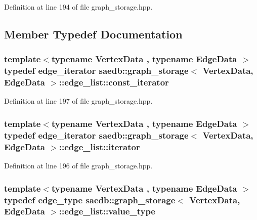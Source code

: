 Definition at line 194 of file graph\-\_\-storage.\-hpp.



\subsection{Member Typedef Documentation}
\hypertarget{classsaedb_1_1graph__storage_1_1edge__list_a830dd554e74e9322240247109b704635}{
\subsubsection[{const\-\_\-iterator}]{\setlength{\rightskip}{0pt plus 5cm}template$<$typename Vertex\-Data , typename Edge\-Data $>$ typedef {\bf edge\-\_\-iterator} {\bf saedb\-::graph\-\_\-storage}$<$ Vertex\-Data, Edge\-Data $>$\-::{\bf edge\-\_\-list\-::const\-\_\-iterator}}}\label{d3/d38/classsaedb_1_1graph__storage_1_1edge__list_a830dd554e74e9322240247109b704635}


Definition at line 197 of file graph\-\_\-storage.\-hpp.

\hypertarget{classsaedb_1_1graph__storage_1_1edge__list_ad2b3368008717c7522cdc2b461e7d35a}{
\subsubsection[{iterator}]{\setlength{\rightskip}{0pt plus 5cm}template$<$typename Vertex\-Data , typename Edge\-Data $>$ typedef {\bf edge\-\_\-iterator} {\bf saedb\-::graph\-\_\-storage}$<$ Vertex\-Data, Edge\-Data $>$\-::{\bf edge\-\_\-list\-::iterator}}}\label{d3/d38/classsaedb_1_1graph__storage_1_1edge__list_ad2b3368008717c7522cdc2b461e7d35a}


Definition at line 196 of file graph\-\_\-storage.\-hpp.

\hypertarget{classsaedb_1_1graph__storage_1_1edge__list_a5ee589042b74f82446a17c08a8e7813f}{
\subsubsection[{value\-\_\-type}]{\setlength{\rightskip}{0pt plus 5cm}template$<$typename Vertex\-Data , typename Edge\-Data $>$ typedef {\bf edge\-\_\-type} {\bf saedb\-::graph\-\_\-storage}$<$ Vertex\-Data, Edge\-Data $>$\-::{\bf edge\-\_\-list\-::value\-\_\-type}}}\label{d3/d38/classsaedb_1_1graph__storage_1_1edge__list_a5ee589042b74f82446a17c08a8e7813f}


